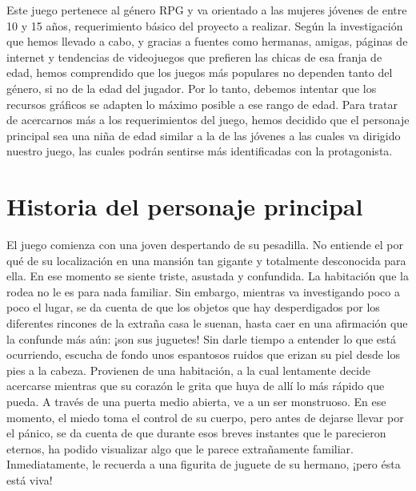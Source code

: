 Este juego pertenece al género RPG y va orientado a las mujeres jóvenes de entre 10 y 15 años, requerimiento básico del proyecto a realizar. Según la investigación que hemos llevado a cabo, y gracias a fuentes como hermanas, amigas, páginas de internet y tendencias de videojuegos que prefieren las chicas de esa franja de edad, hemos comprendido que los juegos más populares no dependen tanto del género, si no de la edad del jugador. Por lo tanto, debemos intentar que los recursos gráficos se adapten lo máximo posible a ese rango de edad. Para tratar de acercarnos más a los requerimientos del juego, hemos decidido que el personaje principal sea una niña de edad similar a la de las jóvenes a las cuales va dirigido nuestro juego, las cuales podrán sentirse más identificadas con la protagonista.

\newpage

\section{Historia del personaje principal}

El juego comienza con una joven despertando de su pesadilla. No entiende el por qué de su localización en una mansión tan gigante y totalmente desconocida para ella. En ese momento se siente triste, asustada y confundida. La habitación que la rodea no le es para nada familiar. Sin embargo, mientras va investigando poco a poco el lugar, se da cuenta de que los objetos que hay desperdigados por los diferentes rincones de la extraña casa le suenan, hasta caer en una afirmación que la confunde más aún: ¡son sus juguetes!
Sin darle tiempo a entender lo que está ocurriendo, escucha de fondo unos espantosos ruidos que erizan su piel desde los pies a la cabeza. Provienen de una habitación, a la cual lentamente decide acercarse mientras que su corazón le grita que huya de allí lo más rápido que pueda. A través de una puerta medio abierta, ve a un ser monstruoso. En ese momento, el miedo toma el control de su cuerpo, pero antes de dejarse llevar por el pánico, se da cuenta de que durante esos breves instantes que le parecieron eternos, ha podido visualizar algo que le parece extrañamente familiar. Inmediatamente, le recuerda a una figurita de juguete de su hermano, ¡pero ésta está viva! 


